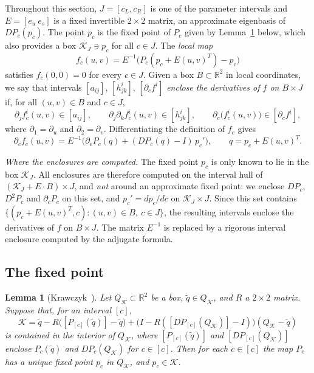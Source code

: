 \documentclass[11pt]{amsart}
\newtheorem{lemma}[thm]{Lemma}
\theoremstyle{definition}
\theoremstyle{remark}
\newcommand{\R}{\mathbb{R}}
\newcommand{\ival}[1]{[#1]}
\newcommand{\eu}{e_u}
\newcommand{\es}{e_s}
\newcommand{\Kr}{\mathcal{K}}
\begin{document}
Throughout this section, $J=[c_L,c_R]$ is one of the parameter intervals and $E=[\eu\ \es]$ is a fixed
invertible $2\times2$ matrix, an approximate eigenbasis of $DP_c(p_c)$. The point $p_c$ is the fixed point
of $P_c$ given by Lemma~\ref{lem:krawczyk} below, which also provides a box $\Kr_J\ni p_c$ for all
$c\in J$. The \emph{local map}
\[
f_c(u,v)=E^{-1}\bigl(P_c(p_c+E(u,v)^T)-p_c\bigr)
\]
satisfies $f_c(0,0)=0$ for every $c\in J$. Given a box $B\subset\R^2$ in local coordinates, we say that
intervals $\ival{a_{ij}}$, $\ival{h^i_{jk}}$, $\ival{\partial_cf^i}$ \emph{enclose the derivatives of $f$
on $B\times J$} if, for all $(u,v)\in B$ and $c\in J$,
\[
\partial_j f^i_c(u,v)\in\ival{a_{ij}},\qquad
\partial_j\partial_k f^i_c(u,v)\in\ival{h^i_{jk}},\qquad
\partial_c\bigl(f^i_c(u,v)\bigr)\in\ival{\partial_cf^i},
\]
where $\partial_1=\partial_u$ and $\partial_2=\partial_v$. Differentiating the definition of $f_c$ gives
\begin{equation}\label{eq:fc}
\partial_c f_c(u,v)=E^{-1}\bigl(\partial_cP_c(q)+(DP_c(q)-I)\,p_c'\bigr),\qquad q=p_c+E(u,v)^T .
\end{equation}

\emph{Where the enclosures are computed.} The fixed point $p_c$ is only known to lie in the box $\Kr_J$.
All enclosures are therefore computed on the interval hull of $(\Kr_J+E\cdot B)\times J$, and \emph{not}
around an approximate fixed point: we enclose $DP_c$, $D^2P_c$ and $\partial_cP_c$ on this set, and
$p_c'=dp_c/dc$ on $\Kr_J\times J$. Since this set contains $\{(p_c+E(u,v)^T,c):(u,v)\in B,\ c\in J\}$, the
resulting intervals enclose the derivatives of $f$ on $B\times J$. The matrix $E^{-1}$ is replaced by a
rigorous interval enclosure computed by the adjugate formula.

\subsection{The fixed point}

\begin{lemma}[Krawczyk~\cite{Krawczyk69}]\label{lem:krawczyk}
Let $Q_\Kr\subset\R^2$ be a box, $\tilde q\in Q_\Kr$, and $R$ a $2\times2$ matrix. Suppose that, for an
interval $\ival{c}$,
\[
\Kr=\tilde q-R\bigl(\ival{P_{\ival c}(\tilde q)}-\tilde q\bigr)+\bigl(I-R(\ival{DP_{\ival c}(Q_\Kr)}-I)\bigr)(Q_\Kr-\tilde q)
\]
is contained in the interior of $Q_\Kr$, where $\ival{P_{\ival c}(\tilde q)}$ and
$\ival{DP_{\ival c}(Q_\Kr)}$ enclose $P_c(\tilde q)$ and $DP_c(Q_\Kr)$ for $c\in\ival c$. Then for each
$c\in\ival c$ the map $P_c$ has a unique fixed point $p_c$ in $Q_\Kr$, and $p_c\in\Kr$.
\end{lemma}
\end{document}

